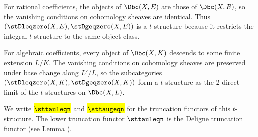 \begin{definition}
    For rational coefficients, the objects of $\Dbc(X, E)$ are those of $\Dbc(X, R)$, so the vanishing conditions on cohomology sheaves are identical. Thus $(\stDleqzero(X, E), \stDgeqzero(X, E))$ is a $t$-structure because it restricts the integral $t$-structure to the same object class.

    For algebraic coefficients, every object of $\Dbc(X, K)$ descends to some finite extension $L/K$. The vanishing conditions on cohomology sheaves are preserved under base change along $L' / L$, so the subcategories $(\stDleqzero(X, K), \stDgeqzero(X, K))$ form a $t$-structure as the 2-direct limit of the $t$-structures on $\Dbc(X, L)$.

    We write \hl{$\sttauleqn$} and \hl{$\sttaugeqn$} for the truncation functors of this $t$-structure. The lower truncation functor $\sttauleqn$ is the Deligne truncation functor (see Lemma {\cite[II.6.1]{kiehl_weissauer_wcps}}).
\end{definition}